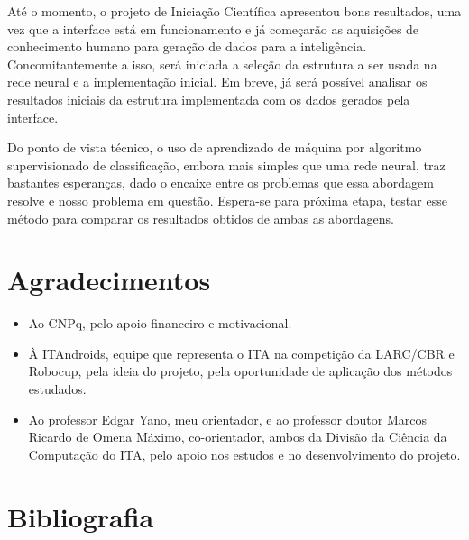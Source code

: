 \documentclass[a4paper,12pt]{article}
\begin{document}
Até o momento, o projeto de Iniciação Científica apresentou bons resultados, uma vez que a interface está em funcionamento e já começarão as aquisições de conhecimento humano para geração de dados para a inteligência. Concomitantemente a isso, será iniciada a seleção da estrutura a ser usada na rede neural e a implementação inicial. Em breve, já será possível analisar os resultados iniciais da estrutura implementada com os dados gerados pela interface.

Do ponto de vista técnico, o uso de aprendizado de máquina por algoritmo supervisionado de classificação, embora mais simples que uma rede neural, traz bastantes esperanças, dado o encaixe entre os problemas que essa abordagem resolve e nosso problema em questão. Espera-se para próxima etapa, testar esse método para comparar os resultados obtidos de ambas as abordagens.

\section{Agradecimentos}

\begin{itemize}
\item Ao CNPq, pelo apoio financeiro e motivacional.
\item À ITAndroids, equipe que representa o ITA na competição da LARC/CBR e Robocup, pela ideia do projeto, pela oportunidade de aplicação dos métodos estudados.
\item Ao professor Edgar Yano, meu orientador, e ao professor doutor Marcos Ricardo de Omena Máximo, co-orientador, ambos da Divisão da Ciência da Computação do ITA, pelo apoio nos estudos e no desenvolvimento do projeto.

\end{itemize}

\section{Bibliografia}

\printbibliography
\end{document}
